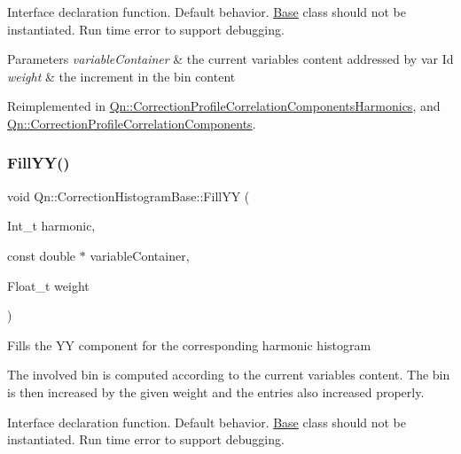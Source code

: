 Interface declaration function. Default behavior. \mbox{\hyperlink{classBase}{Base}} class should not be instantiated. Run time error to support debugging.


\begin{DoxyParams}{Parameters}
{\em variable\+Container} & the current variables content addressed by var Id \\
\hline
{\em weight} & the increment in the bin content \\
\hline
\end{DoxyParams}


Reimplemented in \mbox{\hyperlink{classQn_1_1CorrectionProfileCorrelationComponentsHarmonics_a2616f4bc573bb7d8cd3ff69d7f0b5e12}{Qn\+::\+Correction\+Profile\+Correlation\+Components\+Harmonics}}, and \mbox{\hyperlink{classQn_1_1CorrectionProfileCorrelationComponents_af033e682edd09ce172db1f23cf4d6865}{Qn\+::\+Correction\+Profile\+Correlation\+Components}}.

\mbox{\label{classQn_1_1CorrectionHistogramBase_a47c735fa34636b5d7132fff4029f13b5}} 
\subsubsection{\texorpdfstring{Fill\+Y\+Y()}{FillYY()}\hspace{0.1cm}{\footnotesize\ttfamily [2/2]}}
{\footnotesize\ttfamily void Qn\+::\+Correction\+Histogram\+Base\+::\+Fill\+YY (\begin{DoxyParamCaption}\item[{Int\+\_\+t}]{harmonic,  }\item[{const double $\ast$}]{variable\+Container,  }\item[{Float\+\_\+t}]{weight }\end{DoxyParamCaption})\hspace{0.3cm}{\ttfamily [virtual]}}

Fills the YY component for the corresponding harmonic histogram

The involved bin is computed according to the current variables content. The bin is then increased by the given weight and the entries also increased properly.

Interface declaration function. Default behavior. \mbox{\hyperlink{classBase}{Base}} class should not be instantiated. Run time error to support debugging.


